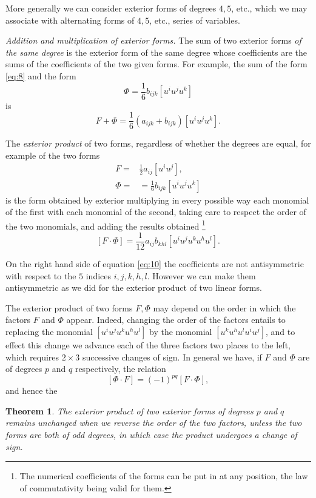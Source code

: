 \documentclass[leqno,11pt]{book}
\numberwithin{equation}{chapter}
\theoremstyle{shape1}
\newtheorem*{thm*}{\hspace{15pt}Theorem}
\theoremstyle{shape0}
\theoremstyle{shape2}
\theoremstyle{definition}
\begin{document}
More generally we can consider exterior forms of degrees $4,5$, {etc.}, which we may associate with alternating forms of $4,5$, {etc.}, series of variables.

\vspace{12pt}\fsec \emph{Addition and multiplication of exterior forms.} The sum of two exterior forms \emph{of the same degree} is the exterior form of the same degree whose coefficients are the sums of the coefficients of the two given forms. For example, the sum of the form \eqref{eq:8} and the form
\begin{equation}
  \label{eq:9}
  \Phi=\frac{1}{6}b_{ijk}[u^{i}u^{j}u^{k}]
\end{equation}
is
\[
F+\Phi=\frac{1}{6}(a_{ijk}+b_{ijk})[u^{i}u^{j}u^{k}].
\]

The \emph{exterior product} of two forms, regardless of whether the degrees are equal, for example of the two forms
\begin{align*}
  F=&\frac{1}{2}a_{ij}[u^{i}u^{j}],\\
  \Phi=&=\frac{1}{6}b_{ijk}[u^{i}u^{j}u^{k}]
\end{align*}
is the form obtained by exterior multiplying in every possible way each monomial of the first  with each monomial of the second, taking care to respect the order of the two monomials, and adding the results obtained \footnote{The numerical coefficients of the forms can be put in at any position, the law of commutativity being valid for them.}
\begin{equation}
  \label{eq:10}
  [F\cdot\Phi]=\frac{1}{12}a_{ij}b_{khl}[u^{i}u^{j}u^{k}u^{h}u^{l}].
\end{equation}

On the right hand side of equation \eqref{eq:10} the coefficients are not antisymmetric with respect to the $5$ indices $i,j,k,h,l$. However we can make them antisymmetric  as we did for the exterior product of two linear forms.

The exterior product of two forms $F,\Phi$ may depend on the order in which the factors $F$ and $\Phi$ appear. Indeed, changing the order of the factors entails to replacing the monomial $[u^{i}u^{j}u^{k}u^{h}u^{l}]$ by the monomial $[u^{k}u^{h}u^{l}u^{i}u^{j}]$, and to effect this change we advance each of the three factors two places to the left, which requires $2\times 3$ successive changes of sign. In general we have, if $F$ and $\Phi$ are of degrees $p$ and $q$ respectively, the relation
\begin{equation}
  \label{eq:11}
  [\Phi\cdot F]=(-1)^{pq}[F\cdot\Phi],
\end{equation}
and hence the
\begin{thm*}
  The exterior product of two exterior forms of degrees $p$ and $q$ remains unchanged when we reverse the order of the two factors, unless the two forms are both of odd degrees, in which case the product undergoes a change of sign.
\end{thm*}
\end{document}
